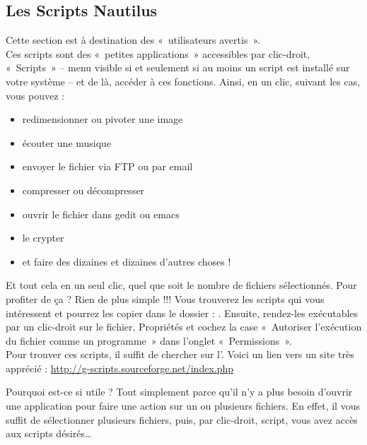 \subsection{Les Scripts Nautilus}
Cette section est à destination des «~utilisateurs avertis~».\\
Ces scripts sont des «~petites applications~» accessibles par clic-droit, «~Scripts~» -- menu visible si et seulement si au moins un script est installé sur votre système -- et de là, accéder à ces fonctions. Ainsi, en un clic, suivant les cas, vous pouvez :\par
\begin{itemize}
\item redimensionner ou pivoter une image 
\item écouter une musique 
\item envoyer le fichier via FTP ou par email 
\item compresser ou décompresser 
\item ouvrir le fichier dans gedit ou emacs 
\item le crypter 
\item et faire des dizaines et dizaines d'autres choses ! 
\end{itemize}
Et tout cela en un seul clic, quel que soit le nombre de fichiers sélectionnés. Pour profiter de ça ? Rien de plus simple !!! Vous trouverez les scripts qui vous intéressent et pourrez les copier dans le dossier : . Ensuite, rendez-les exécutables par un clic-droit sur le fichier, Propriétés et cochez la case «~Autoriser l'exécution du fichier comme un programme~» dans l'onglet «~Permissions~».\\
Pour trouver ces scripts, il suffit de chercher sur l'. Voici un lien vers un site  très apprécié : \url{http://g-scripts.sourceforge.net/index.php}\par
Pourquoi est-ce si utile ? Tout simplement parce qu'il n'y a plus besoin d'ouvrir une application pour faire une action sur un ou plusieurs fichiers. En effet, il vous suffit de sélectionner plusieurs fichiers, puis, par clic-droit, script, vous avez accès aux scripts désirés\ldots{}
